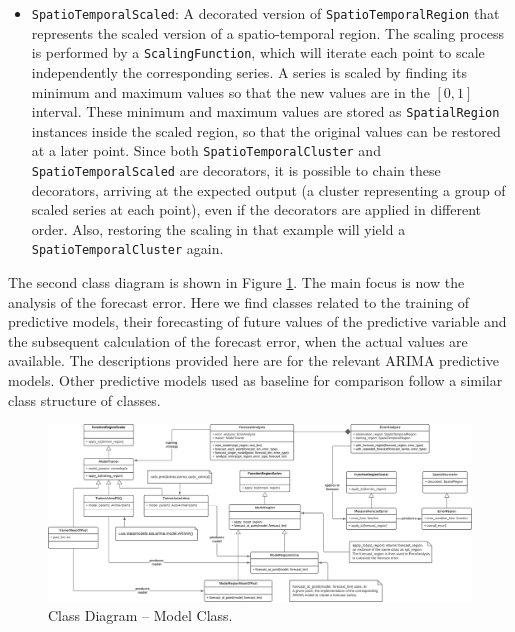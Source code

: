 \begin{itemize}
	\item \texttt{SpatioTemporalScaled}: A decorated version of \texttt{SpatioTemporalRegion} that represents the scaled version of a spatio-temporal region. The scaling process is performed by a \texttt{ScalingFunction}, which will iterate each point to scale independently the corresponding series. A series is scaled by finding its minimum and maximum values so that the new values are in the $[0, 1]$ interval. These minimum and maximum values are stored as \texttt{SpatialRegion} instances inside the scaled region, so that the original values can be restored at a later point. Since both \texttt{SpatioTemporalCluster} and \texttt{SpatioTemporalScaled} are decorators, it is possible to chain these decorators, arriving at the expected output (a cluster representing a group of scaled series at each point), even if the decorators are applied in different order. Also, restoring the scaling in that example will yield a \texttt{SpatioTemporalCluster} again.
\end{itemize}

The second class diagram is shown in Figure \ref{Fig:DiagramClasess-Models}. The main focus is now the analysis of the forecast error. Here we find classes related to the training of predictive models, their forecasting of future values of the predictive variable and the subsequent calculation of the forecast error, when the actual values are available. The descriptions provided here are for the relevant ARIMA predictive models. Other predictive models used as baseline for comparison follow a similar class structure of classes.

\begin{figure}[tp]
	\centering
	\includegraphics[scale=0.36, angle=90]{../Figures/SPT-TSA-ModelsClasses}
	\caption{Class Diagram -- Model Class.}	
	\label{Fig:DiagramClasess-Models}	 		
\end{figure}

